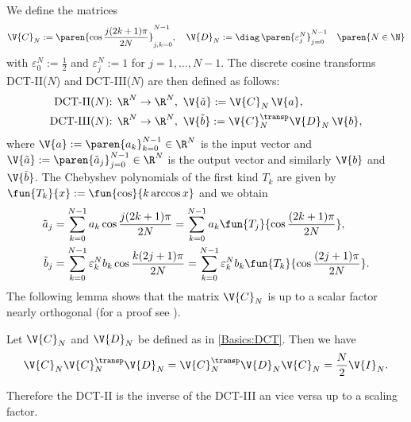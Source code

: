 We define the matrices
\begin{equation}
  \nonumber
  \V{C}_{N} := \paren{\cos \frac{j(2k+1) \pi}{2N}}_{j,k = 0}^{N-1}, \quad \V{D}_N := \diag\, \paren{\varepsilon_j^N}_{j = 0}^{N-1} \quad \paren{N \in \N}
\end{equation}
with $\varepsilon_0^N := \frac{1}{2}$ and $\varepsilon_j^N := 1$ for $j = 1,\ldots,N-1$.
The discrete cosine transforms DCT-II($N$) and DCT-III($N$) are then defined as follows:
\begin{equation}
  \label{Basics:DCT}
  \begin{split}
    \text{DCT-II($N$): } & \R^N \rightarrow \R^N,\ \V{\tilde{a}} := \V{C}_N\, \V{a},\\
    \text{DCT-III($N$): } & \R^N \rightarrow \R^N,\ \V{\tilde{b}} := \V{C}_N^{\transp} \V{D}_N\, \V{b}, 
  \end{split}  
\end{equation}
where $\V{a} := \paren{a_k}_{k=0}^{N-1} \in \R^N$ is the input vector and $\V{\tilde{a}} := 
\paren{\tilde{a}_j}_{j=0}^{N-1} \in \R^N$ is the output vector and similarly $\V{b}$ and $\V{\tilde{b}}$. 
The Chebyshev polynomials of the first kind $T_{k}$ are given by $\fun{T_{k}}{x} := \fun{\cos}{k \arccos x}$ 
and we obtain
\begin{equation}
  \label{Basics:DCT2}
  \begin{split}
    \tilde{a}_{j} & = \sum_{k = 0}^{N-1} a_{k} \cos \frac{j(2k+1)\pi}{2N} = \sum_{k = 0}^{N-1} a_{k} \fun{T_{j}}{\cos \frac{(2k+1) \pi}{2N}},\\
    \tilde{b}_{j} & = \sum_{k = 0}^{N-1} \varepsilon_k^N b_{k} \cos \frac{k(2j+1)\pi}{2N} = \sum_{k = 0}^{N-1} \varepsilon_k^N b_{k} \fun{T_{k}}{\cos \frac{(2j+1) \pi}{2N}}.
  \end{split}  
\end{equation}
The following lemma shows that the matrix $\V{C}_N$ is up to a scalar factor nearly orthogonal (for a proof see \cite{bata}).
\begin{lemma}
  \label{Basics:DCT3}
  Let $\V{C}_N$ and $\V{D}_N$ be defined as in \eqref{Basics:DCT}. Then we have
  $$ \V{C}_N\V{C}_N^{\transp}\V{D}_N = \V{C}_N^{\transp}\V{D}_N\V{C}_N = \frac{N}{2} \V{I}_{N}. $$
\end{lemma}
Therefore the DCT-II is the inverse of the DCT-III an vice versa up to a scaling factor.

